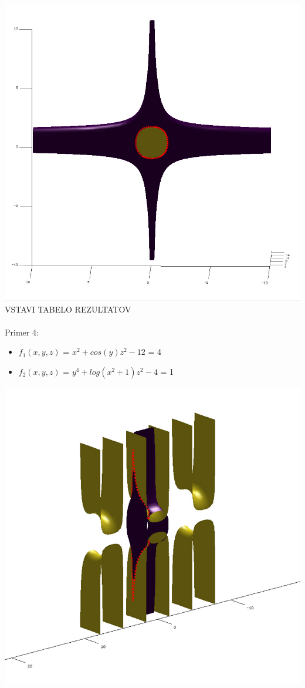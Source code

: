 \documentclass[]{article}
\begin{document}
	\includegraphics[scale=0.3]{primer3_2}
	VSTAVI TABELO REZULTATOV\\ \\
	Primer 4:
	\begin{itemize}  
		\item $f_{1}(x,y,z)$ = $x^2 + cos(y)z^2 - 12$ = 4
		\item $f_{2}(x,y,z)$ = $y^4 + log(x^2 + 1)z^2 - 4$ = 1
	\end{itemize}
	\includegraphics[scale=0.3]{primer4_1}
\end{document}
